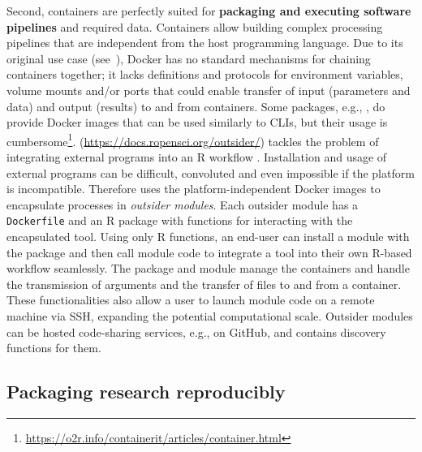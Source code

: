 \label{pipelines} Second, containers are perfectly suited for
\textbf{packaging and executing software pipelines} and required data.
Containers allow building complex processing pipelines that are
independent from the host programming language. Due to its original use
case (see~), Docker has no standard mechanisms for
chaining containers together; it lacks definitions and protocols for
environment variables, volume mounts and/or ports that could enable
transfer of input (parameters and data) and output (results) to and from
containers. Some packages, e.g., , do provide Docker
images that can be used similarly to CLIs, but their usage is
cumbersome\footnote{\href{https://o2r.info/containerit/articles/container.html}{https://o2r.info/containerit/articles/container.html}}.
\textbf{} (\url{https://docs.ropensci.org/outsider/})
tackles the problem of integrating external programs into an R workflow
\citep{bennett_outsider_2020}. Installation and usage of external
programs can be difficult, convoluted and even impossible if the
platform is incompatible. Therefore  uses the
platform-independent Docker images to encapsulate processes in
\emph{outsider modules}. Each outsider module has a \texttt{Dockerfile}
and an R package with functions for interacting with the encapsulated
tool. Using only R functions, an end-user can install a module with the
 package and then call module code to integrate a tool
into their own R-based workflow seamlessly. The  package
and module manage the containers and handle the transmission of
arguments and the transfer of files to and from a container. These
functionalities also allow a user to launch module code on a remote
machine via SSH, expanding the potential computational scale. Outsider
modules can be hosted code-sharing services, e.g., on GitHub, and
 contains discovery functions for them.

\hypertarget{packaging-research-reproducibly}{%
\subsection{Packaging research
reproducibly}\label{packaging-research-reproducibly}}

\label{compendia}

